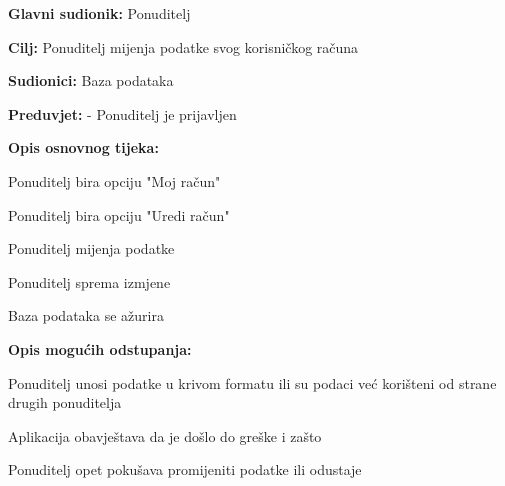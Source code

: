                     \noindent {}
					\begin{packed_item}
	
						\item \textbf{Glavni sudionik: } Ponuditelj
						\item  \textbf{Cilj:} Ponuditelj mijenja podatke svog korisničkog računa
						\item  \textbf{Sudionici:} Baza podataka
						\item  \textbf{Preduvjet:} - Ponuditelj je prijavljen
						\item  \textbf{Opis osnovnog tijeka:}
						
						\item[] \begin{packed_enum}
	
							\item Ponuditelj bira opciju "Moj račun"
							\item Ponuditelj bira opciju "Uredi račun"
	                            				\item Ponuditelj mijenja podatke
                            					\item Ponuditelj sprema izmjene
                            					\item Baza podataka se ažurira
						\end{packed_enum}
						
						\item  \textbf{Opis mogućih odstupanja:}
						
						\item[] \begin{packed_item}
	
							\item[2.a] Ponuditelj unosi podatke u krivom formatu ili su podaci već korišteni od strane drugih ponuditelja
							\item[] \begin{packed_enum}
								
								\item Aplikacija obavještava da je došlo do greške i zašto
								\item Ponuditelj opet pokušava promijeniti podatke ili odustaje
							\end{packed_enum}

                            				
						\end{packed_item}
					\end{packed_item}

